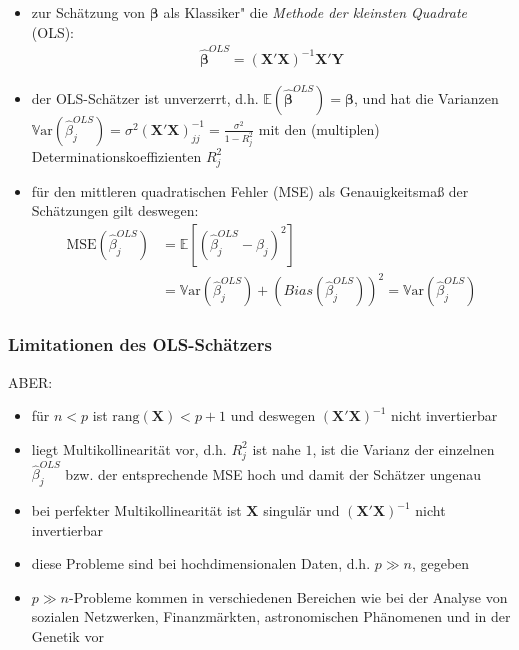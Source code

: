 \documentclass{beamer}
\begin{document}
\begin{frame} %
  \begin{itemize}
  \item zur Schätzung von $\boldsymbol{\beta}$ als \glqq Klassiker" die \textit{Methode der kleinsten Quadrate} (OLS):
  \begin{align*}
  \boldsymbol{\hat{\beta}}^{OLS}=\left(\mathbf{X}'\mathbf{X}\right)^{-1}\mathbf{X}'\mathbf{Y}
  \end{align*}
  \pause \item der OLS-Schätzer ist unverzerrt, d.h. $\mathbb{E}(\boldsymbol{\hat{\beta}}^{OLS})=\boldsymbol{\beta}$, und hat die Varianzen $\mathbb{V}\text{ar}(\hat{\beta}_j^{OLS})=\sigma^2 (\mathbf{X}'\mathbf{X})^{-1}_{jj}=\frac{\sigma^2}{1-R^2_j}$ mit den (multiplen) Determinationskoeffizienten $R^2_j$
  \pause \item für den mittleren quadratischen Fehler (MSE) als Genauigkeitsmaß der Schätzungen gilt deswegen:
  \begin{align*}
  \text{MSE}(\hat{\beta}_j^ {OLS})&=\mathbb{E}[(\hat{\beta}_j^ {OLS} - \beta_j)^2]\\
  &=\mathbb{V}\text{ar}(\hat{\beta}_j^ {OLS})+(Bias(\hat{\beta}_j^ {OLS}))^2=\mathbb{V}\text{ar}(\hat{\beta}_j^ {OLS})
  \end{align*}
  \end{itemize}
\end{frame}




\begin{frame} %
  \frametitle{Limitationen des OLS-Schätzers} 
  ABER: 
    \begin{itemize}
    \pause \item für $n < p$ ist $\text{rang}(\mathbf{X}
    )<p+1$ und deswegen $\left(\mathbf{X}'\mathbf{X}\right)^{-1}$ nicht invertierbar
    \pause \item liegt Multikollinearität vor, d.h. $R^2_j$ ist nahe $1$, ist die Varianz der einzelnen $\hat{\beta}_j^{OLS}$ bzw. der entsprechende MSE hoch und damit der Schätzer ungenau
    \pause \item bei perfekter Multikollinearität ist $\mathbf{X}$ singulär und $\left(\mathbf{X}'\mathbf{X}\right)^{-1}$ nicht invertierbar
    \end{itemize}
    \begin{itemize}
    \pause \item diese Probleme sind bei hochdimensionalen Daten, d.h. $p \gg n$, gegeben
    \item $p \gg n$-Probleme kommen in verschiedenen Bereichen wie bei der Analyse von sozialen Netzwerken, Finanzmärkten, astronomischen Phänomenen und in der Genetik vor
    \end{itemize}
    
\end{frame}
\end{document}
